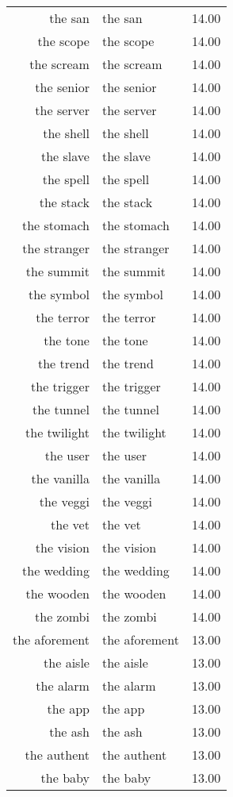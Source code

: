 \begin{table}[ht]
\begin{tabular}{rlr}
  the san & the san & 14.00 \\ 
  the scope & the scope & 14.00 \\ 
  the scream & the scream & 14.00 \\ 
  the senior & the senior & 14.00 \\ 
  the server & the server & 14.00 \\ 
  the shell & the shell & 14.00 \\ 
  the slave & the slave & 14.00 \\ 
  the spell & the spell & 14.00 \\ 
  the stack & the stack & 14.00 \\ 
  the stomach & the stomach & 14.00 \\ 
  the stranger & the stranger & 14.00 \\ 
  the summit & the summit & 14.00 \\ 
  the symbol & the symbol & 14.00 \\ 
  the terror & the terror & 14.00 \\ 
  the tone & the tone & 14.00 \\ 
  the trend & the trend & 14.00 \\ 
  the trigger & the trigger & 14.00 \\ 
  the tunnel & the tunnel & 14.00 \\ 
  the twilight & the twilight & 14.00 \\ 
  the user & the user & 14.00 \\ 
  the vanilla & the vanilla & 14.00 \\ 
  the veggi & the veggi & 14.00 \\ 
  the vet & the vet & 14.00 \\ 
  the vision & the vision & 14.00 \\ 
  the wedding & the wedding & 14.00 \\ 
  the wooden & the wooden & 14.00 \\ 
  the zombi & the zombi & 14.00 \\ 
  the aforement & the aforement & 13.00 \\ 
  the aisle & the aisle & 13.00 \\ 
  the alarm & the alarm & 13.00 \\ 
  the app & the app & 13.00 \\ 
  the ash & the ash & 13.00 \\ 
  the authent & the authent & 13.00 \\ 
  the baby & the baby & 13.00 \\ 

\end{tabular}
\end{table}
